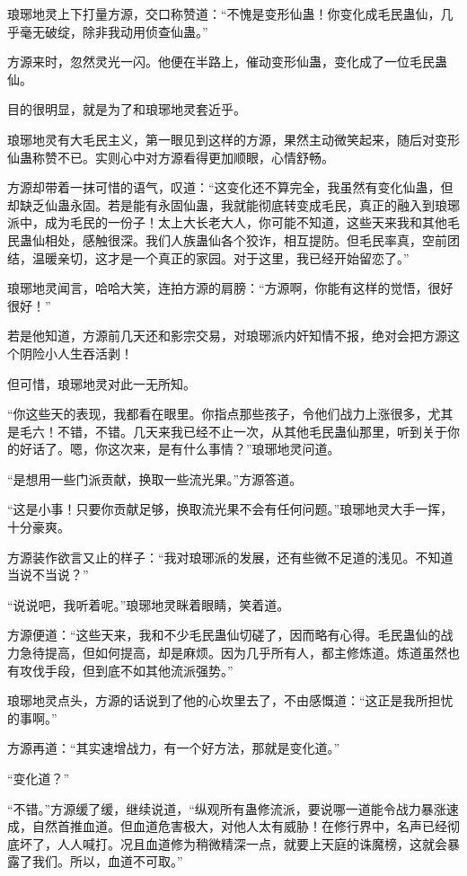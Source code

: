 \begin{this_body}
琅琊地灵上下打量方源，交口称赞道：“不愧是变形仙蛊！你变化成毛民蛊仙，几乎毫无破绽，除非我动用侦查仙蛊。”

方源来时，忽然灵光一闪。他便在半路上，催动变形仙蛊，变化成了一位毛民蛊仙。

目的很明显，就是为了和琅琊地灵套近乎。

琅琊地灵有大毛民主义，第一眼见到这样的方源，果然主动微笑起来，随后对变形仙蛊称赞不已。实则心中对方源看得更加顺眼，心情舒畅。

方源却带着一抹可惜的语气，叹道：“这变化还不算完全，我虽然有变化仙蛊，但却缺乏仙蛊永固。若是能有永固仙蛊，我就能彻底转变成毛民，真正的融入到琅琊派中，成为毛民的一份子！太上大长老大人，你可能不知道，这些天来我和其他毛民蛊仙相处，感触很深。我们人族蛊仙各个狡诈，相互提防。但毛民率真，空前团结，温暖亲切，这才是一个真正的家园。对于这里，我已经开始留恋了。”

琅琊地灵闻言，哈哈大笑，连拍方源的肩膀：“方源啊，你能有这样的觉悟，很好很好！”

若是他知道，方源前几天还和影宗交易，对琅琊派内奸知情不报，绝对会把方源这个阴险小人生吞活剥！

但可惜，琅琊地灵对此一无所知。

“你这些天的表现，我都看在眼里。你指点那些孩子，令他们战力上涨很多，尤其是毛六！不错，不错。几天来我已经不止一次，从其他毛民蛊仙那里，听到关于你的好话了。嗯，你这次来，是有什么事情？”琅琊地灵问道。

“是想用一些门派贡献，换取一些流光果。”方源答道。

“这是小事！只要你贡献足够，换取流光果不会有任何问题。”琅琊地灵大手一挥，十分豪爽。

方源装作欲言又止的样子：“我对琅琊派的发展，还有些微不足道的浅见。不知道当说不当说？”

“说说吧，我听着呢。”琅琊地灵眯着眼睛，笑着道。

方源便道：“这些天来，我和不少毛民蛊仙切磋了，因而略有心得。毛民蛊仙的战力急待提高，但如何提高，却是麻烦。因为几乎所有人，都主修炼道。炼道虽然也有攻伐手段，但到底不如其他流派强势。”

琅琊地灵点头，方源的话说到了他的心坎里去了，不由感慨道：“这正是我所担忧的事啊。”

方源再道：“其实速增战力，有一个好方法，那就是变化道。”

“变化道？”

“不错。”方源缓了缓，继续说道，“纵观所有蛊修流派，要说哪一道能令战力暴涨速成，自然首推血道。但血道危害极大，对他人太有威胁！在修行界中，名声已经彻底坏了，人人喊打。况且血道修为稍微精深一点，就要上天庭的诛魔榜，这就会暴露了我们。所以，血道不可取。”


\end{this_body}
